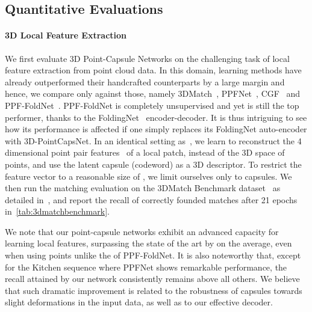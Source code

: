 \documentclass[10pt,twocolumn,letterpaper]{article}
\theoremstyle{break}
\begin{document}
\subsection{Quantitative Evaluations}
\paragraph{3D Local Feature Extraction}
We first evaluate 3D Point-Capsule Networks on the challenging task of local feature extraction from point cloud data. 
In this domain, learning methods have already outperformed their handcrafted counterparts by a large margin and hence, we compare only against those, namely 3DMatch~\cite{zeng20163dmatch}, PPFNet~\cite{deng2018ppfnet}, CGF~\cite{Khoury_2017_ICCV}
and PPF-FoldNet~\cite{Deng_2018_ECCV}. PPF-FoldNet is completely unsupervised and yet is still the top performer, thanks to the FoldingNet~\cite{Yang_2018_CVPR} encoder-decoder. It is thus intriguing to see how its performance is affected if one simply replaces its FoldingNet auto-encoder with 3D-PointCapsNet. In an identical setting as~\cite{Deng_2018_ECCV}, we learn to reconstruct the 4 dimensional point pair features~\cite{birdal2015point, birdal2017point} of a local patch, instead of the 3D space of points, and use the latent capsule (codeword) as a 3D descriptor. To restrict the feature vector to a reasonable size of , we limit ourselves only to  capsules. 
We then run the matching evaluation on the 3DMatch Benchmark dataset~\cite{zeng20163dmatch} as detailed in~\cite{Deng_2018_ECCV}, and report the recall of correctly founded matches after 21 epochs in~\cref{tab:3dmatchbenchmark}.

We note that our point-capsule networks exhibit an advanced capacity for learning local features, surpassing the state of the art by  on the average, even when using  points unlike the  of PPF-FoldNet. It is also noteworthy that, except for the Kitchen sequence where PPFNet shows remarkable performance, the recall attained by our network consistently remains above all others. We believe that such dramatic improvement is related to the robustness of capsules towards slight deformations in the input data, as well as to our effective decoder.\vspace{-2mm}
\end{document}
